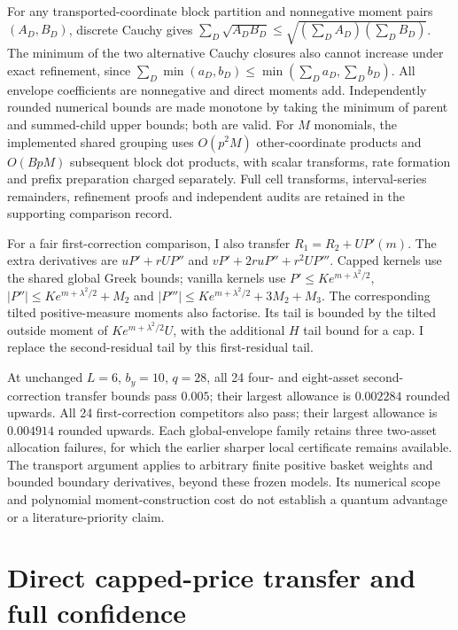\documentclass[11pt]{article}
\begin{document}
For any transported-coordinate block partition and nonnegative moment
pairs $(A_D,B_D)$, discrete Cauchy gives
$\sum_D\sqrt{A_DB_D}\leq\sqrt{(\sum_DA_D)(\sum_DB_D)}$.
The minimum of the two alternative Cauchy closures also cannot increase
under exact refinement, since $\sum_D\min(a_D,b_D)\leq
\min(\sum_Da_D,\sum_Db_D)$. All envelope coefficients are nonnegative
and direct moments add. Independently rounded numerical bounds are made
monotone by taking the minimum of parent and summed-child upper bounds;
both are valid. For $M$ monomials, the implemented shared grouping uses
$O(p^2M)$ other-coordinate products and $O(BpM)$ subsequent block dot
products, with scalar transforms, rate formation and prefix preparation
charged separately. Full cell transforms, interval-series remainders,
refinement proofs and independent audits are retained in the supporting
comparison record.

For a fair first-correction comparison, I also transfer
$R_1=R_2+UP'(m)$. The extra derivatives are
$uP'+rUP''$ and $vP'+2ruP''+r^2UP'''$. Capped kernels use the shared
global Greek bounds; vanilla kernels use
$P'\leq Ke^{m+\lambda^2/2}$, $|P''|\leq Ke^{m+\lambda^2/2}+M_2$
and $|P'''|\leq Ke^{m+\lambda^2/2}+3M_2+M_3$.
The corresponding tilted positive-measure moments also factorise.
Its tail is bounded by the tilted outside moment of
$Ke^{m+\lambda^2/2}U$, with the additional $H$ tail bound for a cap.
I replace the second-residual tail by this first-residual tail.

At unchanged $L=6$, $b_y=10$, $q=28$, all 24 four- and eight-asset
second-correction transfer bounds pass $0.005$; their largest allowance
is $0.002284$ rounded upwards. All 24 first-correction competitors
also pass; their largest allowance is $0.004914$ rounded upwards.
Each global-envelope family retains three two-asset allocation failures,
for which the earlier sharper local certificate remains available.
The transport argument applies to arbitrary finite positive basket
weights and bounded boundary derivatives, beyond these frozen models.
Its numerical scope and polynomial moment-construction cost do not
establish a quantum advantage or a literature-priority claim.

\section{Direct capped-price transfer and full confidence}
\label{app:direct-capped-price}
\end{document}
